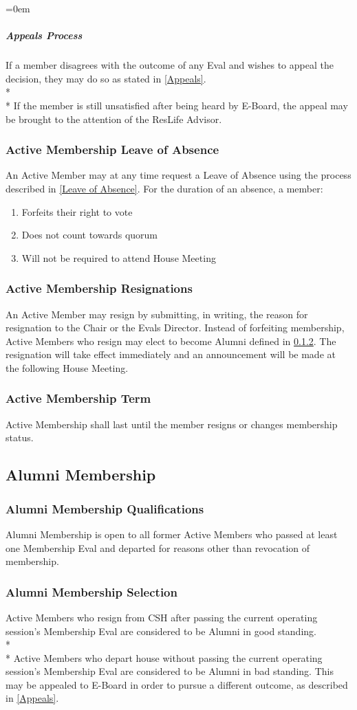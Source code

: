 \documentclass{article}
\newcommand{\asection}[1]{\subsection{#1} \label{#1}}
\newcommand{\asubsection}[1]{\subsubsection{#1} \label{#1}}
\newcommand{\asubsubsubsection}[1]{\parindent=0em\subparagraph{#1} \label{#1}}
\begin{document}
\asubsubsubsection{Appeals Process}
If a member disagrees with the outcome of any Eval and wishes to appeal the decision, they may do so as stated in \ref{Appeals}.
\\* \\*
If the member is still unsatisfied after being heard by E-Board, the appeal may be brought to the attention of the ResLife Advisor.

\asubsection{Active Membership Leave of Absence}
\renewcommand{\theenumi}{\alph{enumi}} %

An Active Member may at any time request a Leave of Absence using the process described in \ref{Leave of Absence}.
For the duration of an absence, a member:
\begin{enumerate}
	\item Forfeits their right to vote
	\item Does not count towards quorum
	\item Will not be required to attend House Meeting
\end{enumerate}

\asubsection{Active Membership Resignations}
An Active Member may resign by submitting, in writing, the reason for resignation to the Chair or the Evals Director.
Instead of forfeiting membership, Active Members who resign may elect to become Alumni defined in \ref{Alumni Membership Selection}.
The resignation will take effect immediately and an announcement will be made at the following House Meeting.

\asubsection{Active Membership Term}
Active Membership shall last until the member resigns or changes membership status.

\asection{Alumni Membership}

\asubsection{Alumni Membership Qualifications}
Alumni Membership is open to all former Active Members who passed at least one Membership Eval and departed for reasons other than revocation of membership.

\asubsection{Alumni Membership Selection}
Active Members who resign from CSH after passing the current operating session's Membership Eval are considered to be Alumni in good standing.
\\*\\*
Active Members who depart house without passing the current operating session's Membership Eval are considered to be Alumni in bad standing.
This may be appealed to E-Board in order to pursue a different outcome, as described in \ref{Appeals}.
\end{document}
